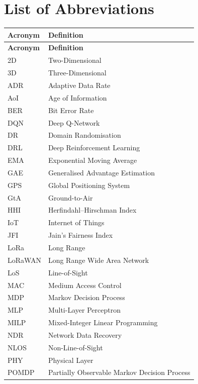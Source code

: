 \section*{List of Abbreviations}

\begin{longtable}{ll}
    \toprule
    \textbf{Acronym} & \textbf{Definition} \\
    \midrule
    \endfirsthead
    \toprule
    \textbf{Acronym} & \textbf{Definition} \\
    \midrule
    \endhead
    \bottomrule
    \endfoot
    2D      & Two-Dimensional \\
    3D      & Three-Dimensional \\
    ADR     & Adaptive Data Rate \\
    AoI     & Age of Information \\
    BER     & Bit Error Rate \\
    DQN     & Deep Q-Network \\
    DR      & Domain Randomisation \\
    DRL     & Deep Reinforcement Learning \\
    EMA     & Exponential Moving Average \\
    GAE     & Generalised Advantage Estimation \\
    GPS     & Global Positioning System \\
    GtA     & Ground-to-Air \\
    HHI     & Herfindahl--Hirschman Index \\
    IoT     & Internet of Things \\
    JFI     & Jain's Fairness Index \\
    LoRa    & Long Range \\
    LoRaWAN & Long Range Wide Area Network \\
    LoS     & Line-of-Sight \\
    MAC     & Medium Access Control \\
    MDP     & Markov Decision Process \\
    MLP     & Multi-Layer Perceptron \\
    MILP    & Mixed-Integer Linear Programming \\
    NDR     & Network Data Recovery \\
    NLOS    & Non-Line-of-Sight \\
    PHY     & Physical Layer \\
    POMDP   & Partially Observable Markov Decision Process \\

\end{longtable}
